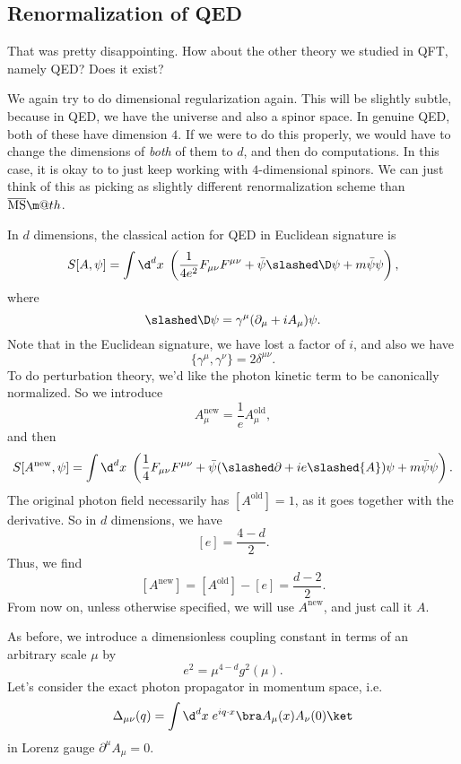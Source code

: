 \documentclass[a4paper]{article}
\makeatletter
\newcommand*{\textoverline}[1]{$\overline{\hbox{#1}}\m@th$}
\makeatother
\begin{document}
\subsection{Renormalization of QED}
That was pretty disappointing. How about the other theory we studied in QFT, namely QED? Does it exist?

We again try to do dimensional regularization again. This will be slightly subtle, because in QED, we have the universe and also a spinor space. In genuine QED, both of these have dimension $4$. If we were to do this properly, we would have to change the dimensions of \emph{both} of them to $d$, and then do computations. In this case, it is okay to to just keep working with $4$-dimensional spinors. We can just think of this as picking as slightly different renormalization scheme than \textoverline{MS}.

In $d$ dimensions, the classical action for QED in Euclidean signature is
\[
  S[A, \psi] = \int \d^d x\; \left(\frac{1}{4 e^2} F_{\mu\nu}F^{\mu\nu} + \bar\psi \slashed \D \psi + m \bar\psi\psi\right),
\]
where
\[
  \slashed \D\psi = \gamma^\mu (\partial_\mu + i A_\mu) \psi.
\]
Note that in the Euclidean signature, we have lost a factor of $i$, and also we have
\[
  \{\gamma^\mu, \gamma^\nu\} = 2 \delta^{\mu\nu}.
\]
To do perturbation theory, we'd like the photon kinetic term to be canonically normalized. So we introduce
\[
  A_\mu^{\mathrm{new}} = \frac{1}{e} A_\mu^{\mathrm{old}},
\]
and then
\[
  S[A^\mathrm{new}, \psi] = \int \d^d x\; \left(\frac{1}{4} F_{\mu\nu}F^{\mu\nu} + \bar\psi (\slashed\partial + i e \slashed{A}) \psi + m \bar\psi \psi\right).
\]
The original photon field necessarily has $[A^{\mathrm{old}}] = 1$, as it goes together with the derivative. So in $d$ dimensions, we have
\[
  [e] = \frac{4 - d}{2}.
\]
Thus, we find
\[
  [A^{\mathrm{new}}] = [A^{\mathrm{old}}] - [e] = \frac{d - 2}{2}.
\]
From now on, unless otherwise specified, we will use $A^{\mathrm{new}}$, and just call it $A$.

As before, we introduce a dimensionless coupling constant in terms of an arbitrary scale $\mu$ by
\[
  e^2 = \mu^{4 - d} g^2(\mu).
\]
Let's consider the exact photon propagator in momentum space, i.e.
\[
  \Delta_{\mu\nu}(q) = \int \d^d x\; e^{iq \cdot x} \bra A_\mu (x) A_\nu(0)\ket
\]
in Lorenz gauge $\partial^\mu A_\mu = 0$.
\end{document}
